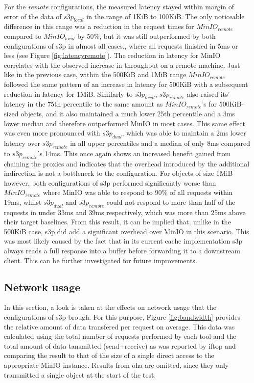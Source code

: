 For the \textit{remote} configurations, the measured latency stayed within margin of error of the data of ${s3p}_{local}$ in the range of 1KiB to 100KiB. The only noticeable difference in this range was a reduction in the request times for ${MinIO}_{remote}$ compared to ${MinIO}_{local}$ by 50\%, but it was still outperformed by both configurations of s3p in almost all cases., where all requests finished in 5ms or less (see Figure \ref{fig:latencyremote}). The reduction in latency for MinIO correlates with the observed increase in throughput on a remote machine. Just like in the previous case, within the 500KiB and 1MiB range ${MinIO}_{remote}$ followed the same pattern of an increase in latency for 500KiB with a subsequent reduction in latency for 1MiB.
Similarly to ${s3p}_{local}$, ${s3p}_{remote}$ also raised its' latency in the 75th percentile to the same amount as ${MinIO}_{remote}$'s for 500KiB-sized objects, and it also maintained a much lower 25th percentile and a 3ms lower median and therefore outperformed MinIO in most cases. This same effect was even more pronounced with ${s3p}_{dual}$, which was able to maintain a 2ms lower latency over ${s3p}_{remote}$ in all upper percentiles and a median of only 8ms compared to ${s3p}_{remote}$'s 14ms.
This once again shows an increased benefit gained from chaining the proxies and indicates that the overhead introduced by the additional indirection is not a bottleneck to the configuration.
For objects of size 1MiB however, both configurations of s3p performed significantly worse than ${MinIO}_{remote}$ where MinIO was able to respond to 90\% of all requests within 19ms, whilst ${s3p}_{dual}$ and ${s3p}_{remote}$ could not respond to more than half of the requests in under 33ms and 39ms respectively, which was more than 25ms above their target baselines.
From this result, it can be implied that, unlike in the 500KiB case, s3p did add a significant overhead over MinIO in this scenario. This was most likely caused by the fact that in its current cache implementation s3p always reads a full response into a buffer before forwarding it to a downstream client. This can be further investigated for future improvements.

\subsection{Network usage}

In this section, a look is taken at the effects on network usage that the configurations of s3p brough. For this purpose, Figure \ref{fig:bandwidth} provides the relative amount of data transfered per request on average. This data was calculated using the total number of requests performed by each tool and the total amount of data tansmitted (send+receive) as was reported by iftop and comparing the result to that of the size of a single direct access to the appropriate MinIO instance.
Results from oha are omitted, since they only transmitted a single object at the start of the test.
\pagebreak
\bandwidthlocs
\pgfplotstabletranspose[colnames from=colnames]\Tbandwidthlocs{\bandwidthlocs}

